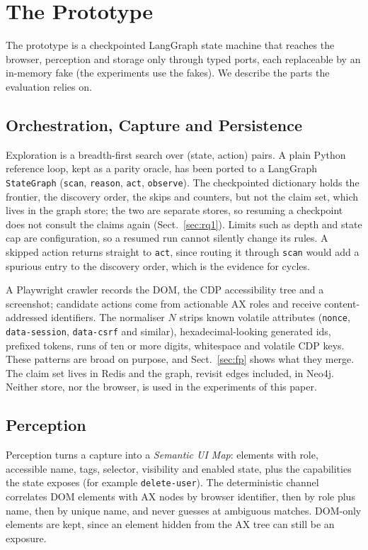 \section{The \sys{} Prototype}
\label{sec:system}


The prototype is a checkpointed LangGraph state machine that reaches the
browser, perception and storage only through typed ports, each replaceable by an
in-memory fake (the experiments use the fakes). We describe the parts the
evaluation relies on.

\subsection{Orchestration, Capture and Persistence}

Exploration is a breadth-first search over (state, action) pairs. A plain Python
reference loop, kept as a parity oracle, has been ported to a LangGraph
\texttt{StateGraph} (\texttt{scan}, \texttt{reason}, \texttt{act},
\texttt{observe}). The checkpointed dictionary holds the frontier, the discovery
order, the skips and counters, but not the claim set, which lives in the graph
store; the two are separate stores, so resuming a checkpoint does not consult the
claims again (Sect.~\ref{sec:rq1}). Limits such as depth and state cap are
configuration, so a resumed run cannot silently change its rules. A skipped
action returns straight to \texttt{act}, since routing it through \texttt{scan}
would add a spurious entry to the discovery order, which is the evidence for
cycles.

A Playwright crawler records the DOM, the CDP accessibility tree and a screenshot;
candidate actions come from actionable AX roles and receive content-addressed
identifiers. The normaliser $N$ strips known volatile attributes
(\texttt{nonce}, \texttt{data-session}, \texttt{data-csrf} and similar),
hexadecimal-looking generated ids, prefixed tokens, runs of ten or more digits,
whitespace and volatile CDP keys. These patterns are broad on purpose, and
Sect.~\ref{sec:fp} shows what they merge. The claim set lives in Redis and the
graph, revisit edges included, in Neo4j. Neither store, nor the browser, is used in
the experiments of this paper.

\subsection{Perception}
\label{sec:perception}

Perception turns a capture into a \emph{Semantic UI Map}: elements with role,
accessible name, tags, selector, visibility and enabled state, plus the
capabilities the state exposes (for example \texttt{delete-user}). The
deterministic channel correlates DOM elements with AX nodes by browser identifier,
then by role plus name, then by unique name, and never guesses at ambiguous
matches. DOM-only elements are kept, since an element hidden from the AX tree can still be an exposure.

